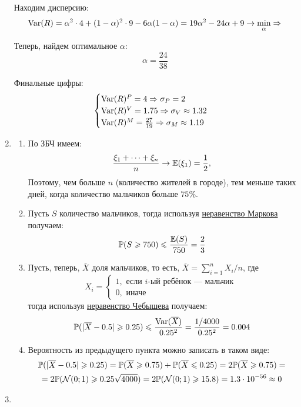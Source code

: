 \documentclass[12pt, a4paper]{article}\usepackage[]{graphicx}\usepackage[]{color}
\newcommand{\cN}{\mathcal{N}}
\begin{document}
\begin{enumerate}
Находим дисперсию:
\[
\operatorname{Var}(R) = \alpha^2 \cdot 4 + (1-\alpha)^2 \cdot 9 - 6\alpha (1-\alpha) = 19\alpha^2 -24\alpha + 9 \to \min_{\alpha} \Rightarrow
\]

Теперь, найдем оптимальное $\alpha$:
\[
\alpha = \frac{24}{38}
\]

Финальные цифры:
\[
\begin{cases}
\operatorname{Var}(R)^{P} = 4 \Rightarrow \sigma_{P} = 2 \\
\operatorname{Var}(R)^{V} = 1.75 \Rightarrow \sigma_{V} \approx 1.32 \\
\operatorname{Var}(R)^{M} = \frac{27}{19} \Rightarrow \sigma_{M} \approx 1.19 \\
\end{cases}
\]

\item
\begin{enumerate}
\item По ЗБЧ имеем:
\[
\frac{\xi_1 + \dots + \xi_n}{n} \to \mathbb{E}(\xi_1) = \frac{1}{2},
\]
Поэтому, чем больше $n$ (количество жителей в городе), тем меньше таких дней, когда количество мальчиков больше $75\%.$ \\
\item Пусть $S$ количество мальчиков, тогда используя \href{https://en.wikipedia.org/wiki/Markov%27s_inequality}{неравенство Маркова} получаем:
\[
\mathbb{P}(S \geqslant 750) \leqslant \frac{\mathbb{E}(S)}{750} = \frac{2}{3}
\]
\item Пусть, теперь, $\bar X$ доля мальчиков, то есть, $\overline{X} = \sum_{i=1}^n X_i /n$, где
\[
X_i =
\begin{cases}
1, \text{ если }i\text{-ый ребёнок — мальчик }\\
0, \text{ иначе }
\end{cases}
\]
тогда используя \href{https://en.wikipedia.org/wiki/Markov%27s_inequality}{неравенство Чебышева} получаем:
\[
\mathbb{P}(|\overline{X} - 0.5| \geqslant 0.25) \leqslant \frac{\operatorname{Var}(\overline{X})}{0.25^2} = \frac{1/4000}{0.25^2} = 0.004
\]
\item Вероятность из предыдущего пункта можно записать в таком виде:
\begin{multline*}
\P(|\overline{X} - 0.5| \ge 0.25) = \P(\overline{X} \ge 0.75) + \P(\overline{X} \le 0.25) = 2\P(\overline{X} \ge 0.75)=\\
= 2\P(\cN(0;1)\geq 0.25\sqrt{4000})=2\P(\cN(0;1)\geq 15.8) = 1.3 \cdot 10^{-56} \approx 0
\end{multline*}
\end{enumerate}

\item


\end{enumerate}
\end{document}
